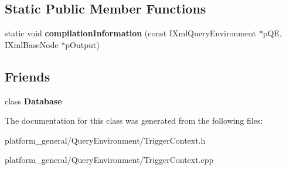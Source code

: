 \subsection*{\-Static \-Public \-Member \-Functions}
\begin{DoxyCompactItemize}
\item 
\hypertarget{classgeneral__server_1_1TriggerContextDatabaseAttribute_a4a58b954bfaf52dd6b262d64944d376e}{static void {\bfseries compilation\-Information} (const \-I\-Xml\-Query\-Environment $\ast$p\-Q\-E, \-I\-Xml\-Base\-Node $\ast$p\-Output)}\label{classgeneral__server_1_1TriggerContextDatabaseAttribute_a4a58b954bfaf52dd6b262d64944d376e}

\end{DoxyCompactItemize}
\subsection*{\-Friends}
\begin{DoxyCompactItemize}
\item 
\hypertarget{classgeneral__server_1_1TriggerContextDatabaseAttribute_a6efef52d7a939622bbc934ff6b90ffe0}{class {\bfseries \-Database}}\label{classgeneral__server_1_1TriggerContextDatabaseAttribute_a6efef52d7a939622bbc934ff6b90ffe0}

\end{DoxyCompactItemize}


\-The documentation for this class was generated from the following files\-:\begin{DoxyCompactItemize}
\item 
platform\-\_\-general/\-Query\-Environment/\-Trigger\-Context.\-h\item 
platform\-\_\-general/\-Query\-Environment/\-Trigger\-Context.\-cpp\end{DoxyCompactItemize}

